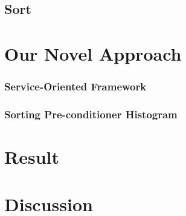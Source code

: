 \documentclass[times, 10pt,onecolumn]{article} %
\begin{document}
\subsection{Sort\cite{ps}}
\section{Our Novel Approach}
\subsubsection{Service-Oriented Framework}
\subsubsection{Sorting Pre-conditioner Histogram}
\section{Result}
\section{Discussion}


\end{document}
